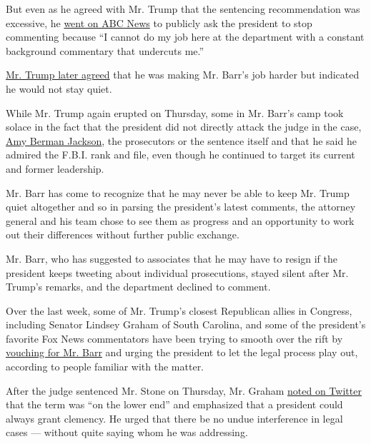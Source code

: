 But even as he agreed with Mr. Trump that the sentencing recommendation
was excessive, he
\href{https://abcnews.go.com/Politics/barr-blasts-trumps-tweets-stone-case-impossible-job/story?id=68963276\&cid=social_twitter_wnt}{went
on ABC News} to publicly ask the president to stop commenting because
``I cannot do my job here at the department with a constant background
commentary that undercuts me.''

\href{https://www.nytimes3xbfgragh.onion/2020/02/10/us/roger-stone-prison-sentence.html}{Mr.
Trump later agreed} that he was making Mr. Barr's job harder but
indicated he would not stay quiet.

While Mr. Trump again erupted on Thursday, some in Mr. Barr's camp took
solace in the fact that the president did not directly attack the judge
in the case,
\href{https://www.nytimes3xbfgragh.onion/2020/02/20/us/politics/amy-berman-jackson-roger-stone.html}{Amy
Berman Jackson}, the prosecutors or the sentence itself and that he said
he admired the F.B.I. rank and file, even though he continued to target
its current and former leadership.

Mr. Barr has come to recognize that he may never be able to keep Mr.
Trump quiet altogether and so in parsing the president's latest
comments, the attorney general and his team chose to see them as
progress and an opportunity to work out their differences without
further public exchange.

Mr. Barr, who has suggested to associates that he may have to resign if
the president keeps tweeting about individual prosecutions, stayed
silent after Mr. Trump's remarks, and the department declined to
comment.

Over the last week, some of Mr. Trump's closest Republican allies in
Congress, including Senator Lindsey Graham of South Carolina, and some
of the president's favorite Fox News commentators have been trying to
smooth over the rift by
\href{https://twitter.com/LindseyGrahamSC/status/1228072754685136896}{vouching
for Mr. Barr} and urging the president to let the legal process play
out, according to people familiar with the matter.

After the judge sentenced Mr. Stone on Thursday, Mr. Graham
\href{https://twitter.com/LindseyGrahamSC/status/1230555882536128512?s=20}{noted
on Twitter} that the term was ``on the lower end'' and emphasized that a
president could always grant clemency. He urged that there be no undue
interference in legal cases --- without quite saying whom he was
addressing.

